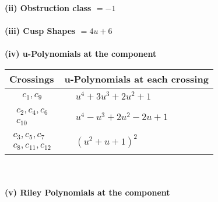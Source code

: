 \documentclass[1p]{elsarticle_modified}
\theoremstyle{definition}
\begin{document}
\flushleft \textbf{(ii) Obstruction class $= -1$}\\~\\
\flushleft \textbf{(iii) Cusp Shapes $= 4 u+6$}\\~\\
\newpage\renewcommand{\arraystretch}{1}
\flushleft \textbf{(iv) u-Polynomials at the component}\newline \\
\begin{tabular}{m{50pt}|m{274pt}}
Crossings & \hspace{64pt}u-Polynomials at each crossing \\
\hline $$\begin{aligned}c_{1},c_{9}\end{aligned}$$&$\begin{aligned}
&u^4+3 u^3+2 u^2+1
\end{aligned}$\\
\hline $$\begin{aligned}c_{2},c_{4},c_{6}\\c_{10}\end{aligned}$$&$\begin{aligned}
&u^4- u^3+2 u^2-2 u+1
\end{aligned}$\\
\hline $$\begin{aligned}c_{3},c_{5},c_{7}\\c_{8},c_{11},c_{12}\end{aligned}$$&$\begin{aligned}
&(u^2+u+1)^2
\end{aligned}$\\
\hline
\end{tabular}\\~\\
\newpage\renewcommand{\arraystretch}{1}
\flushleft \textbf{(v) Riley Polynomials at the component}\newline \\
\end{document}
